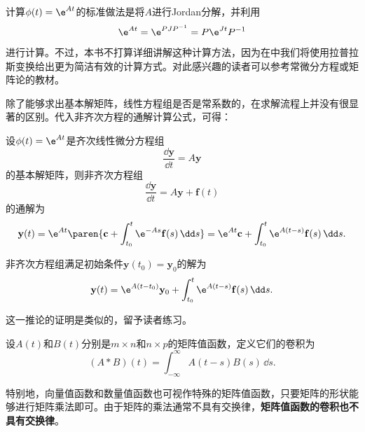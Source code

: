计算$\phi(t)=\e^{At}$的标准做法是将$A$进行Jordan分解，并利用
\begin{equation}
    \e^{At}=\e^{PJP^{-1}}=P\e^{Jt}P^{-1}
\end{equation}
进行计算。不过，本书不打算详细讲解这种计算方法，因为在中我们将使用拉普拉斯变换给出更为简洁有效的计算方式。对此感兴趣的读者可以参考常微分方程\cite{ode}或矩阵论的教材。

除了能够求出基本解矩阵，线性方程组是否是常系数的，在求解流程上并没有很显著的区别。代入非齐次方程的通解计算公式，可得：
\begin{theorem}
    设$\phi(t)=\e^{At}$是齐次线性微分方程组
    \begin{equation}
        \frac{\dd\mathbf{y}}{\dd t}=A\mathbf{y}
    \end{equation}
    的基本解矩阵，则非齐次方程组
    \begin{equation}
        \frac{\dd\mathbf{y}}{\dd t}=A\mathbf{y}+\mathbf{f}(t)
    \end{equation}
    的通解为
    \begin{equation}
        \mathbf{y}(t)=\e^{At}\paren{\mathbf{c}+\int_{t_0}^t \e^{-As}\mathbf{f}(s)\,\dd s}=\e^{At}\mathbf{c}+\int_{t_0}^t \e^{A(t-s)}\mathbf{f}(s)\,\dd s.
    \end{equation}
\end{theorem}

\begin{corollary}\label{cor:differential_equation_system}
    非齐次方程组满足初始条件$\mathbf{y}(t_0)=\mathbf{y}_0$的解为
    \begin{equation}
        \mathbf{y}(t)=\e^{A(t-t_0)}\mathbf{y}_0+\int_{t_0}^t \e^{A(t-s)}\mathbf{f}(s)\,\dd s.
    \end{equation}
\end{corollary}

这一推论的证明是类似的，留予读者练习。

\begin{definition}[矩阵值函数的卷积]
    设$A(t)$和$B(t)$分别是$m\times n$和$n\times p$的矩阵值函数，定义它们的卷积为
    \begin{equation}
        (A*B)(t)=\int_{-\infty}^{\infty} A(t-s)B(s)\,\dd s.
    \end{equation}
\end{definition}

特别地，向量值函数和数量值函数也可视作特殊的矩阵值函数，只要矩阵的形状能够进行矩阵乘法即可。由于矩阵的乘法通常不具有交换律，\textbf{矩阵值函数的卷积也不具有交换律}。

